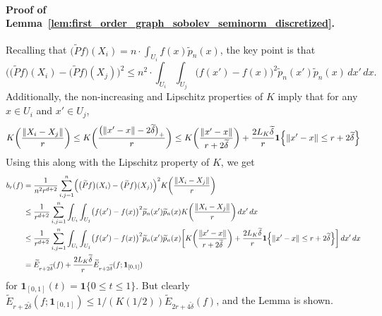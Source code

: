 \documentclass{article}
\newcommand{\1}{\mathbf{1}}
\newcommand{\wt}[1]{\widetilde{#1}}
\theoremstyle{alden}
\theoremstyle{aldenthm}
\theoremstyle{definition}
\theoremstyle{remark}
\begin{document}
\paragraph{Proof of Lemma~\ref{lem:first_order_graph_sobolev_seminorm_discretized}.}
Recalling that $\bigl(\wt{P}f\bigr)(X_i) = n \cdot \int_{U_i} f(x) \wt{p}_n(x)$, the key point is that
\begin{equation*}
\biggl(\bigl(\wt{P}f\bigr)(X_i) - \bigl(\wt{P}f\bigr)(X_j)\biggr)^2 \leq n^2 \cdot \int_{U_i} \int_{U_j} \bigl(f(x') - f(x)\bigr)^2 \wt{p}_n(x') \wt{p}_n(x) \,dx' \,dx.
\end{equation*}
Additionally, the non-increasing and Lipschitz properties of $K$ imply that for any $x \in U_i$ and $x' \in U_j$, 
\begin{equation*}
K\biggl(\frac{\|X_i - X_j\|}{r}\biggr) \leq K\biggl(\frac{\bigl(\|x' - x\| - 2\wt{\delta}\bigr)_{+}}{r}\biggr) \leq K\biggl(\frac{\|x' - x\|}{r + 2\wt{\delta}}\biggr) + \frac{2L_K\wt{\delta}}{r}\1\Bigl\{\|x' - x\| \leq r + 2\wt{\delta}\Bigr\}
\end{equation*}
Using this along with the Lipschitz property of $K$, we get
\begin{align*}
b_r(f) & = \frac{1}{n^2r^{d + 2}} \sum_{i,j = 1}^n \Bigl(\bigl(\wt{P}f\bigr)(X_i) - \bigl(\wt{P}f\bigr)(X_j)\Bigr)^2 K\biggl(\frac{\|X_i - X_j\|}{r}\biggr) \\
& \leq \frac{1}{r^{d + 2}} \sum_{i,j = 1}^n \int_{U_i} \int_{U_j}  \bigl(f(x') - f(x)\bigr)^2 \wt{p}_n(x') \wt{p}_n(x) K\biggl(\frac{\|X_i - X_j\|}{r}\biggr) \,dx' \,dx \\
& \leq \frac{1}{r^{d + 2}} \sum_{i,j = 1}^n \int_{U_i} \int_{U_j}  \bigl(f(x') - f(x)\bigr)^2 \wt{p}_n(x') \wt{p}_n(x) \biggl[K\biggl(\frac{\|x' - x\|}{r + 2\wt{\delta}}\biggr) + \frac{2L_K\wt{\delta}}{r}\1\Bigl\{\|x' - x\| \leq r + 2\wt{\delta}\Bigr\}\biggr] \,dx' \,dx \\
& = \wt{E}_{r + 2\wt{\delta}}(f) + \frac{2L_K\wt{\delta}}{r}\wt{E}_{r + 2\wt{\delta}}(f; \1_{[0,1]})
\end{align*}
for $\1_{[0,1]}(t) = \1\{0 \leq t \leq 1\}$. But clearly $\wt{E}_{r + 2\wt\delta}(f; \1_{[0,1]}) \leq 1/(K(1/2))\wt{E}_{2r + 4\wt{\delta}}(f)$, and the Lemma is shown.
\end{document}
